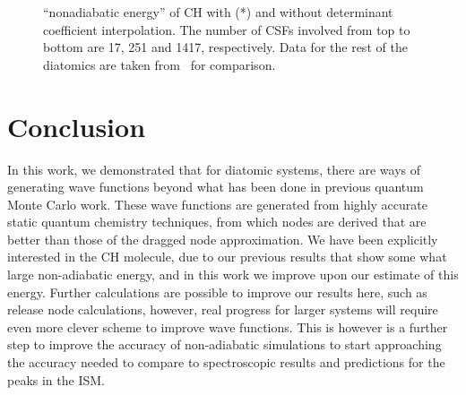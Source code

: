 \documentclass[aip,jcp,numerical,reprint]{revtex4-1}
\begin{document}
\begin{figure}[h]
\caption{``nonadiabatic energy'' of CH with (*) and without determinant coefficient interpolation. The number of CSFs involved from top to bottom are 17, 251 and 1417, respectively. Data for the rest of the diatomics are taken from~\cite{Yang2015} for comparison.\label{fig:ch-interp} }
\end{figure}

\section{Conclusion}

In this work, we demonstrated that for diatomic systems, there are ways of generating wave functions beyond what has been done in previous quantum Monte Carlo work.  These wave functions are generated from highly accurate static quantum chemistry techniques, from which nodes are derived that are better than those of the dragged node approximation.  We have been explicitly interested in the CH molecule, due to our previous results that show some what large non-adiabatic energy, and in this work we improve upon our estimate of this energy.  Further calculations are possible to improve our results here, such as release node calculations, however, real progress for larger systems will require even more clever scheme to improve wave functions.   This is however is a further step to improve the accuracy of non-adiabatic simulations to start approaching the accuracy needed to compare to spectroscopic results and predictions for the peaks in the ISM.
\end{document}
